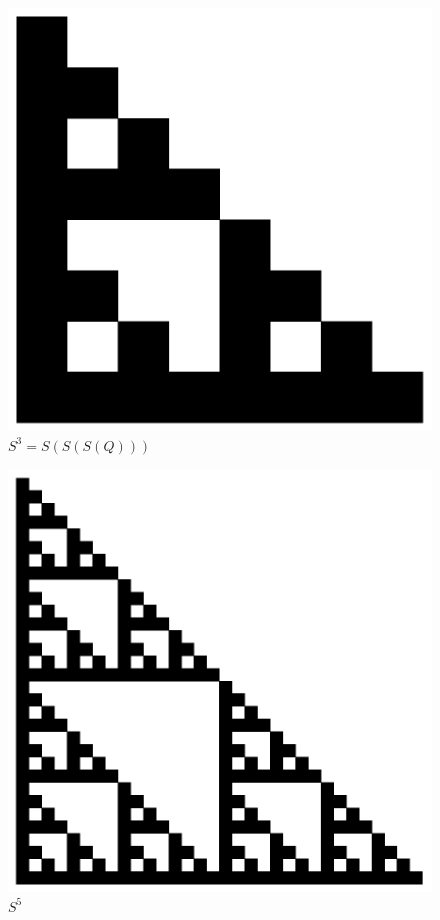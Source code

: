 \documentclass{beamer}
\begin{document}
\begin{frame}
    \begin{figure}
        \centering
        \includegraphics[scale=0.5]{3.pdf}
        \caption{$S^3 = S(S(S(Q)))$}
    \end{figure}
\end{frame}

\begin{frame}
    \begin{figure}
        \centering
        \includegraphics[scale=0.5]{5.pdf}
        \caption{$S^5$}
    \end{figure}
\end{frame}
\end{document}
